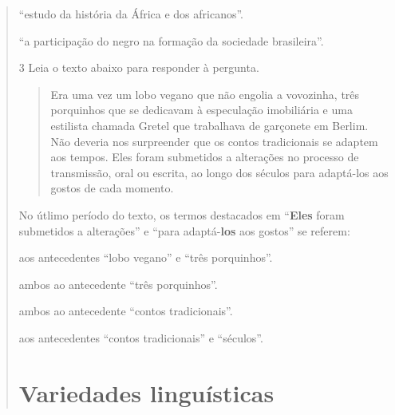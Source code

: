 \begin{quote}
{\begin{escolha}
  \item ``estudo da história da África e dos africanos''.
  
  \item ``a participação do negro na formação da sociedade brasileira''.

\end{escolha}


\num{3} Leia o texto abaixo para responder à pergunta.

\begin{quote}

Era uma vez um lobo vegano que não engolia a vovozinha, três
porquinhos que se dedicavam à especulação imobiliária e uma estilista
chamada Gretel que trabalhava de garçonete em Berlim. Não deveria nos
surpreender que os contos tradicionais se adaptem aos tempos. Eles foram
submetidos a alterações no processo de transmissão, oral ou escrita, ao
longo dos séculos para adaptá-los aos gostos de cada momento.

\end{quote}


No útlimo período do texto, os termos destacados em ``\textbf{Eles} foram
submetidos a alterações'' e ``para adaptá-\textbf{los} aos gostos'' se referem:

\begin{escolha}

  \item aos antecedentes ``lobo vegano'' e ``três porquinhos''.

  \item ambos ao antecedente ``três porquinhos''. 

  \item ambos ao antecedente ``contos tradicionais''.

  \item aos antecedentes ``contos tradicionais'' e ``séculos''.

\end{escolha}


\chapter{Variedades linguísticas}


}
\end{quote}
